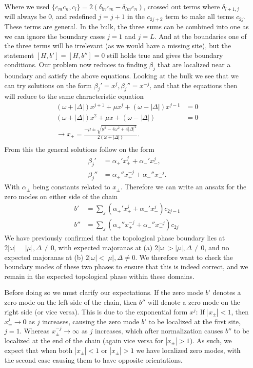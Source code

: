 Where we used $\{c_m c_n, c_l\} = 2(\delta_{ln} c_m - \delta_{lm} c_n)$, crossed out terms where $\delta_{l+1, j}$ will always be 0, and redefined $j = j+1$ in the $c_{2j+2}$ term to make all terms $c_{2j}$. These terms are general. In the bulk, the three sums can be combined into one as we can ignore the boundary cases $j=1$ and $j = L$. And at the boundaries one of the three terms will be irrelevant (as we would have a missing site), but the statement $[H, b'] = [H, b''] = 0$ still holds true and gives the boundary conditions. Our problem now reduces to finding $\beta_j$ that are localized near a boundary and satisfy the above equations. Looking at the bulk we see that we can try solutions on the form $\beta_j' = x^j, \beta_j'' = x^{-j}$, and that the equations then will reduce to the same characteristic equation 
\begin{align}
    (\omega + |\Delta|)x^{j+1} + \mu x^j + (\omega - |\Delta|) x^{j-1} &= 0\\
    (\omega + |\Delta|)x^2 + \mu x + (\omega - |\Delta|) &= 0 \label{eq:characteristic_eq_x_boundaries}\\
    \to x_\pm = \frac{-\mu \pm \sqrt{\mu^2 - 4 \omega^2 + 4 |\Delta|^2}}{2(\omega + |\Delta|)}. \label{eq:x_pm_phases}\\
\end{align}
From this the general solutions follow on the form
\begin{align}
    \beta_j' &= \alpha_+' x_+^j + \alpha_-' x_-^j,\\
    \beta_j'' &= \alpha_+'' x_+^{-j} + \alpha_-'' x_-^{-j}.
\end{align}
With $\alpha_\pm$ being constants related to $x_\pm$. Therefore we can write an ansatz for the zero modes on either side of the chain
\begin{align}
    b' &= \sum_j \left(\alpha_+' x_+^j + \alpha_-' x_-^j \right)c_{2j-1} \\
    b'' &= \sum_j \left(\alpha_+'' x_+^{-j} + \alpha_-'' x_-^{-j} \right)c_{2j} 
\end{align}
We have previously confirmed that the topological phase boundary lies at $2|\omega| = |\mu|, \Delta \neq 0$, with expected majoranas at (a) $2|\omega| > |\mu|, \Delta \neq 0$, and no expected majoranas at (b) $2|\omega| < |\mu|, \Delta \neq 0$. We therefore want to check the boundary modes of these two phases to ensure that this is indeed correct, and we remain in the expected topological phase within these domains.

Before doing so we must clarify our expectations. If the zero mode $b'$ denotes a zero mode on the left side of the chain, then $b''$ will denote a zero mode on the right side (or vice versa). This is due to the exponential form $x^j$: If $|x_\pm| < 1$, then $x_\pm^j \to 0$ as $j$ increases, causing the zero mode $b'$ to be localized at the first site, $j = 1$. Whereas $x_\pm^{-j} \to \infty$ as $j$ increases, which after normalization causes $b''$ to be localized at the  end of the chain (again vice versa for $|x_\pm| > 1$). As such, we expect that when both $|x_\pm| < 1$ or $|x_\pm| > 1$ we have localized zero modes, with the second case causing them to have opposite orientations.

